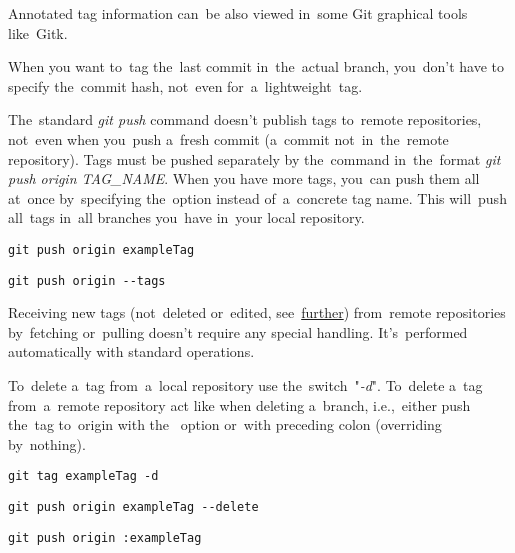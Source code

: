 \noindent Annotated tag information can~be also viewed in~some Git graphical tools like~Gitk.

\note When you want to~tag the~last commit in~the~actual branch, you~don't have to specify the~commit hash, not~even for~a~lightweight~tag.

The~standard \textit{git push} command doesn't publish tags to~remote repositories, not~even when you~push a~fresh commit (a~commit not~in~the~remote repository). Tags must be pushed separately by the~command in~the~format \textit{git push origin TAG\_NAME}. When you have more tags, you~can push them all at~once by~specifying the~option  instead of~a~concrete tag name. This will~push all~tags in~all branches you~have in~your local repository.

\begin{lstlisting}[frame=no]
    git push origin exampleTag
\end{lstlisting}

\begin{lstlisting}[frame=no]
    git push origin --tags
\end{lstlisting}

\note Receiving new tags (not~deleted or~edited, see~\hyperref[gittagsynchronization]{further}) from~remote repositories by~fetching or~pulling doesn't require any special handling. It's~performed automatically with standard operations.

To~delete a~tag from~a~local repository use the~switch~"\textit{-d}". To~delete a~tag from~a~remote repository act like when deleting a~branch, i.e.,~either push the~tag to~origin with the~ option or~with preceding colon (overriding by~nothing).

\begin{lstlisting}[frame=no]
    git tag exampleTag -d
\end{lstlisting}

\begin{lstlisting}[frame=no]
    git push origin exampleTag --delete
\end{lstlisting}

\begin{lstlisting}[frame=no]
    git push origin :exampleTag
\end{lstlisting}

